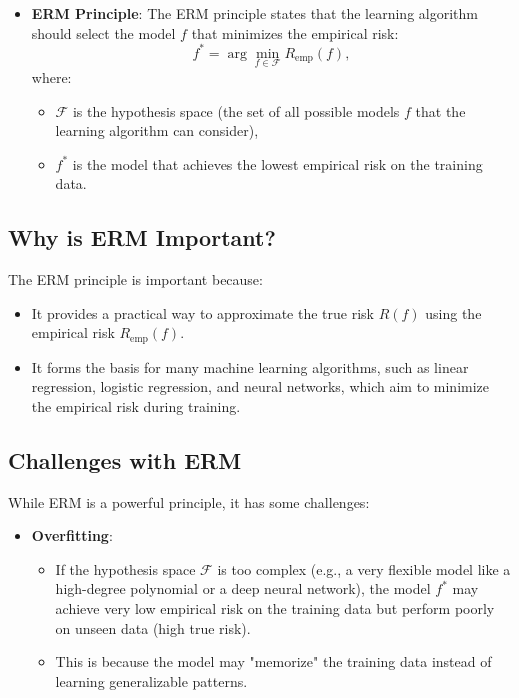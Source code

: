 \begin{notechapter}
\begin{itemize}
    \item \textbf{ERM Principle}:
      The ERM principle states that the learning algorithm should select the model \( f \) that minimizes the empirical risk:
      \[
      f^* = \arg\min_{f \in \mathcal{F}} R_{\text{emp}}(f),
      \]
      where:
      \begin{itemize}
          \item \( \mathcal{F} \) is the hypothesis space (the set of all possible models \( f \) that the learning algorithm can consider),
          \item \( f^* \) is the model that achieves the lowest empirical risk on the training data.
      \end{itemize}
\end{itemize}

\subsection{Why is ERM Important?}

The ERM principle is important because:
\begin{itemize}
    \item It provides a practical way to approximate the true risk \( R(f) \) using the empirical risk \( R_{\text{emp}}(f) \).
    \item It forms the basis for many machine learning algorithms, such as linear regression, logistic regression, and neural networks, which aim to minimize the empirical risk during training.
\end{itemize}

\subsection{Challenges with ERM}

While ERM is a powerful principle, it has some challenges:
\begin{itemize}
    \item \textbf{Overfitting}:
      \begin{itemize}
          \item If the hypothesis space \( \mathcal{F} \) is too complex (e.g., a very flexible model like a high-degree polynomial or a deep neural network), the model \( f^* \) may achieve very low empirical risk on the training data but perform poorly on unseen data (high true risk).
          \item This is because the model may "memorize" the training data instead of learning generalizable patterns.
      \end{itemize}


\end{itemize}
\end{notechapter}
